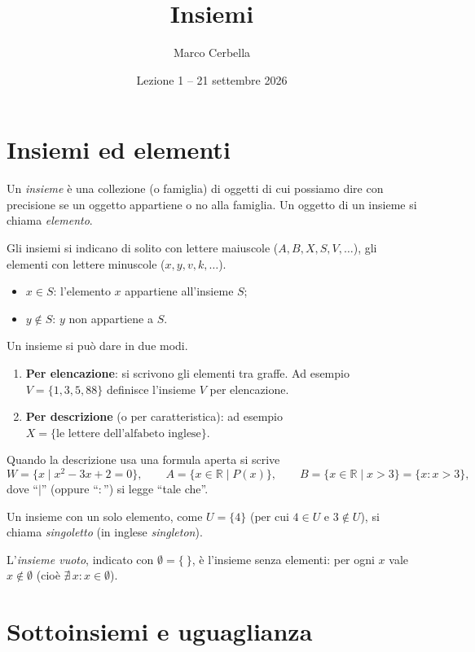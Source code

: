 \documentclass[11pt,a4paper]{article}
\title{Insiemi}
\author{Marco Cerbella}
\date{Lezione 1 -- 21 settembre 2026}
\theoremstyle{definition}
\begin{document}
\maketitle

\section{Insiemi ed elementi}

\begin{definizione}
Un \emph{insieme} è una collezione (o famiglia) di oggetti di cui possiamo
dire con precisione se un oggetto appartiene o no alla famiglia. Un oggetto
di un insieme si chiama \emph{elemento}.
\end{definizione}

Gli insiemi si indicano di solito con lettere maiuscole ($A, B, X, S, V,
\dots$), gli elementi con lettere minuscole ($x, y, v, k, \dots$).
\begin{itemize}
    \item $x \in S$: l'elemento $x$ appartiene all'insieme $S$;
    \item $y \notin S$: $y$ non appartiene a $S$.
\end{itemize}

Un insieme si può dare in due modi.
\begin{enumerate}
    \item \textbf{Per elencazione}: si scrivono gli elementi tra graffe.
          Ad esempio $V = \{1, 3, 5, 88\}$ definisce l'insieme $V$ per
          elencazione.
    \item \textbf{Per descrizione} (o per caratteristica): ad esempio
          $X = \{\text{le lettere dell'alfabeto inglese}\}$.
\end{enumerate}

Quando la descrizione usa una formula aperta si scrive
\[
W = \{x \mid x^2 - 3x + 2 = 0\}, \qquad
A = \{x \in \mathbb{R} \mid P(x)\}, \qquad
B = \{x \in \mathbb{R} \mid x > 3\} = \{x : x > 3\},
\]
dove ``$\mid$'' (oppure ``$:$'') si legge ``tale che''.

Un insieme con un solo elemento, come $U = \{4\}$ (per cui $4 \in U$ e
$3 \notin U$), si chiama \emph{singoletto} (in inglese \emph{singleton}).

L'\emph{insieme vuoto}, indicato con $\emptyset = \{\ \}$, è l'insieme senza
elementi: per ogni $x$ vale $x \notin \emptyset$ (cioè
$\nexists\, x : x \in \emptyset$).

\section{Sottoinsiemi e uguaglianza}
\end{document}
